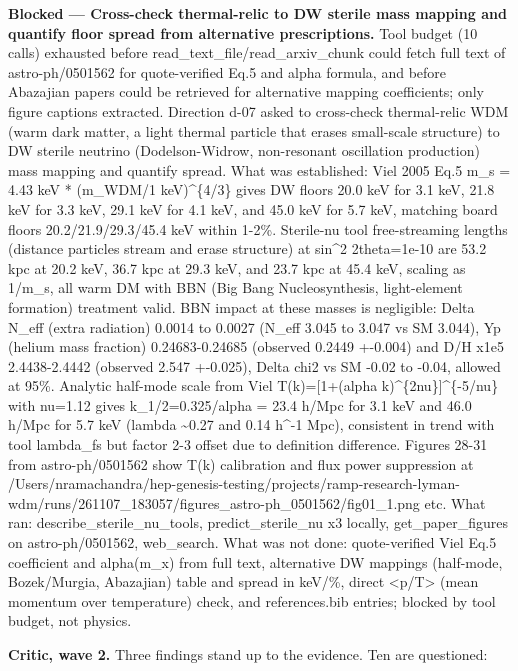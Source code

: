 \documentclass[11pt,a4paper]{article}
\begin{document}
\textbf{Blocked --- Cross-check thermal-relic to DW sterile mass mapping and quantify floor spread from alternative prescriptions.} Tool budget (10 calls) exhausted before read\_text\_file/read\_arxiv\_chunk could fetch full text of astro-ph/0501562 for quote-verified Eq.5 and alpha formula, and before Abazajian papers could be retrieved for alternative mapping coefficients; only figure captions extracted. Direction d-07 asked to cross-check thermal-relic WDM (warm dark matter, a light thermal particle that erases small-scale structure) to DW sterile neutrino (Dodelson-Widrow, non-resonant oscillation production) mass mapping and quantify spread. What was established: Viel 2005 Eq.5 m\_s = 4.43 keV * (m\_WDM/1 keV)\textasciicircum{}\{4/3\} gives DW floors 20.0 keV for 3.1 keV, 21.8 keV for 3.3 keV, 29.1 keV for 4.1 keV, and 45.0 keV for 5.7 keV, matching board floors 20.2/21.9/29.3/45.4 keV within 1-2\%. Sterile-nu tool free-streaming lengths (distance particles stream and erase structure) at sin\textasciicircum{}2 2theta=1e-10 are 53.2 kpc at 20.2 keV, 36.7 kpc at 29.3 keV, and 23.7 kpc at 45.4 keV, scaling as 1/m\_s, all warm DM with BBN (Big Bang Nucleosynthesis, light-element formation) treatment valid. BBN impact at these masses is negligible: Delta N\_eff (extra radiation) 0.0014 to 0.0027 (N\_eff 3.045 to 3.047 vs SM 3.044), Yp (helium mass fraction) 0.24683-0.24685 (observed 0.2449 +-0.004) and D/H x1e5 2.4438-2.4442 (observed 2.547 +-0.025), Delta chi2 vs SM -0.02 to -0.04, allowed at 95\%. Analytic half-mode scale from Viel T(k)=[1+(alpha k)\textasciicircum{}\{2nu\}]\textasciicircum{}\{-5/nu\} with nu=1.12 gives k\_1/2=0.325/alpha = 23.4 h/Mpc for 3.1 keV and 46.0 h/Mpc for 5.7 keV (lambda \textasciitilde{}0.27 and 0.14 h\textasciicircum{}-1 Mpc), consistent in trend with tool lambda\_fs but factor 2-3 offset due to definition difference. Figures 28-31 from astro-ph/0501562 show T(k) calibration and flux power suppression at /Users/nramachandra/hep-genesis-testing/projects/ramp-research-lyman-wdm/runs/261107\_183057/figures\_astro-ph\_0501562/fig01\_1.png etc. What ran: describe\_sterile\_nu\_tools, predict\_sterile\_nu x3 locally, get\_paper\_figures on astro-ph/0501562, web\_search. What was not done: quote-verified Viel Eq.5 coefficient and alpha(m\_x) from full text, alternative DW mappings (half-mode, Bozek/Murgia, Abazajian) table and spread in keV/\%, direct \textless{}p/T\textgreater{} (mean momentum over temperature) check, and references.bib entries; blocked by tool budget, not physics.

\textbf{Critic, wave 2.} Three findings stand up to the evidence. Ten are questioned:
\end{document}
